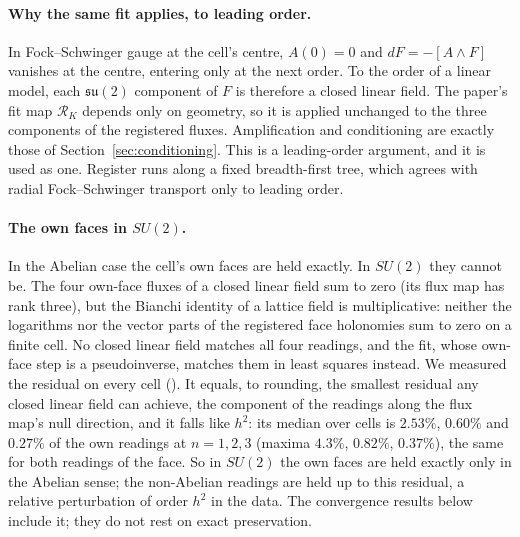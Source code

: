 \documentclass[11pt]{article}
\theoremstyle{definition}
\theoremstyle{remark}
\newcommand{\cR}{\mathcal{R}}
\begin{document}
\paragraph{Why the same fit applies, to leading order.} In Fock--Schwinger gauge at the cell's
centre, $A(0)=0$ and $dF=-[A\wedge F]$ vanishes at the centre, entering only at the next order. To
the order of a linear model, each $\mathfrak{su}(2)$ component of $F$ is therefore a closed
linear field. The paper's fit map $\cR_K$ depends only on geometry, so it is applied unchanged
to the three components of the registered fluxes. Amplification and conditioning are
exactly those of Section~\ref{sec:conditioning}. This is a leading-order argument, and it is
used as one. Register runs along a fixed breadth-first tree, which agrees with radial
Fock--Schwinger transport only to leading order.

\paragraph{The own faces in $SU(2)$.} In the Abelian case the cell's own faces are held exactly.
In $SU(2)$ they cannot be. The four own-face fluxes of a closed linear field sum to zero (its flux
map has rank three), but the Bianchi identity of a lattice field is multiplicative: neither the
logarithms nor the vector parts of the registered face holonomies sum to zero on a finite cell. No
closed linear field matches all four readings, and the fit, whose own-face step is a
pseudoinverse, matches them in least squares instead. We measured the residual on every cell
(). It equals, to rounding, the smallest residual
any closed linear field can achieve, the component of the readings along the flux map's null
direction, and it falls like $h^2$: its median over cells is $2.53\%$, $0.60\%$ and $0.27\%$
of the own readings at $n=1,2,3$ (maxima $4.3\%$, $0.82\%$, $0.37\%$), the same for both
readings of the face. So in $SU(2)$ the own faces are held exactly only in the Abelian sense; the
non-Abelian readings are held up to this residual, a relative perturbation of order $h^2$ in the
data. The convergence results below include it; they do not rest on exact preservation.
\end{document}
